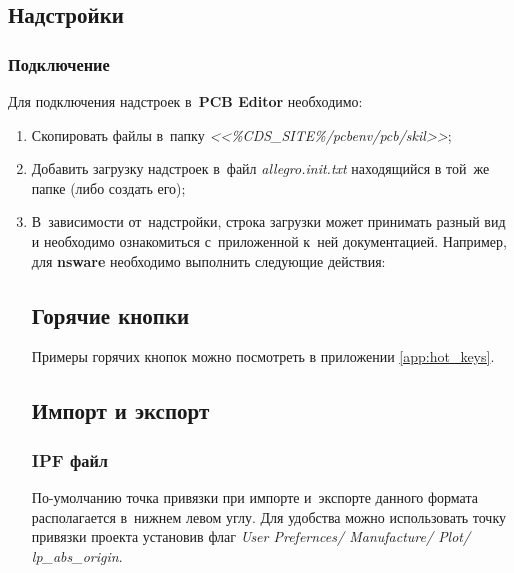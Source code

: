 \newpage
\subsection{Надстройки} \label{ssec:pcb_plugin}



\subsubsection{Подключение} \label{sssec:pcb_plugin_setup}

Для подключения надстроек в~\textbf{PCB Editor} необходимо:
\begin{enumerate}
	\item Скопировать файлы в~папку \textit{<<\%CDS\_SITE\%/pcbenv/pcb/skil>>};
	\item Добавить загрузку надстроек в~файл \textit{allegro.init.txt} находящийся в той~же папке (либо создать его);
	\item В~зависимости от~надстройки, строка загрузки может принимать разный вид и необходимо ознакомиться с~приложенной к~ней документацией. Например, для \textbf{nsware} необходимо выполнить следующие действия:
	\begin{figure}[H]
	\end{figure}
	
	
	 
\newpage
\subsection{Горячие кнопки} \label{ssec:hot_keys}
	 
Примеры горячих кнопок можно посмотреть в приложении \ref{app:hot_keys}.
	 
	 
	 
\newpage
\subsection{Импорт и экспорт} \label{ssec:pcb_import}

\subsubsection{IPF файл}

По-умолчанию точка привязки при импорте и~экспорте данного формата располагается в~нижнем левом углу. Для удобства можно использовать точку привязки проекта установив флаг \textit{User Prefernces/ Manufacture/ Plot/ lp\_abs\_origin}.
	 
\end{enumerate}